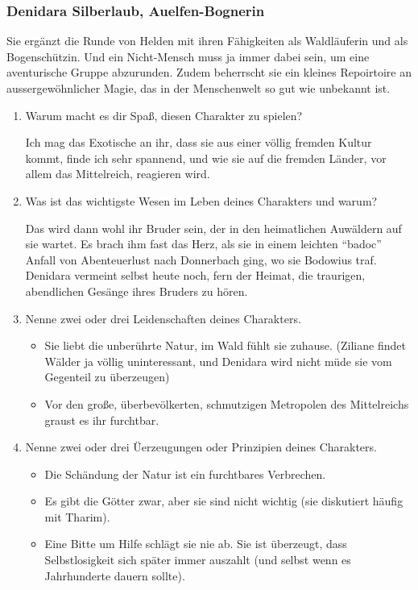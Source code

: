 \subsubsection{Denidara Silberlaub, Auelfen-Bognerin}
Sie ergänzt die Runde von Helden mit ihren Fähigkeiten als Waldläuferin und als Bogenschützin. Und ein Nicht-Mensch muss ja immer dabei sein, um eine aventurische Gruppe abzurunden. Zudem beherrscht sie ein kleines Repoirtoire an aussergewöhnlicher Magie, das in der Menschenwelt so gut wie unbekannt ist.

\begin{enumerate}
  \item Warum macht es dir Spaß, diesen Charakter zu spielen?

Ich mag das Exotische an ihr, dass sie aus einer völlig fremden Kultur kommt, finde ich sehr spannend, und wie sie auf die fremden Länder, vor allem das Mittelreich, reagieren wird.
 
  \item Was ist das wichtigste Wesen im Leben deines Charakters und warum?

Das wird dann wohl ihr Bruder sein, der in den heimatlichen Auwäldern auf sie wartet. Es brach ihm fast das Herz, als sie in einem leichten ``badoc'' Anfall von Abenteuerlust nach Donnerbach ging, wo sie Bodowius traf. Denidara vermeint selbst heute noch, fern der Heimat, die traurigen, abendlichen Gesänge ihres Bruders zu hören.
 
  \item Nenne zwei oder drei Leidenschaften deines Charakters. 

  \begin{itemize}
    \item Sie liebt die unberührte Natur, im Wald fühlt sie zuhause. (Ziliane findet Wälder ja völlig uninteressant, und Denidara wird nicht müde sie vom Gegenteil zu überzeugen)
    \item Vor den große, überbevölkerten, schmutzigen Metropolen des Mittelreichs graust es ihr furchtbar.
  \end{itemize}

  \item Nenne zwei oder drei Üerzeugungen oder Prinzipien deines Charakters.

  \begin{itemize}
    \item Die Schändung der Natur ist ein furchtbares Verbrechen.
    \item Es gibt die Götter zwar, aber sie sind nicht wichtig (sie diskutiert häufig mit Tharim).
    \item Eine Bitte um Hilfe schlägt sie nie ab. Sie ist überzeugt, dass Selbstlosigkeit sich später immer auszahlt (und selbst wenn es Jahrhunderte dauern sollte).
  \end{itemize}
\end{enumerate}







